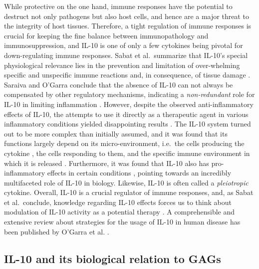 While protective on the one hand, immune responses have the potential to
destruct not only pathogens but also host cells, and hence are a major threat to
the integrity of host tissues. Therefore, a tight regulation of immune responses
is crucial for keeping the fine balance between immunopathology and
immunosuppression, and IL-10 is one of only a few cytokines being pivotal for
down-regulating immune responses. Sabat et al.\ summarize that IL-10's special
physiological relevance lies in the prevention and limitation of over-whelming
specific and unspecific immune reactions and, in consequence, of tissue damage
\cite{sabat_bio_il10_review_2010}. Saraiva and O'Garra conclude that the absence
of IL-10 can not always be compensated by other regulatory mechanisms,
indicating a \textit{non-redundant} role for IL-10 in limiting inflammation
\cite{saraiva_ogarra_2010}. However, despite the observed anti-inflammatory
effects of IL-10, the attempts to use it directly as a therapeutic agent in
various inflammatory conditions yielded disappointing results
\cite{il10_therapy_review_2003}. The IL-10 system turned out to be more complex
than initially assumed, and it was found that its functions largely depend on
its micro-environment, i.e.\ the cells producing the cytokine
\cite{roers_mueller_2008}, the cells responding to them, and the specific immune
environment in which it is released \cite{mosser_il10_newperspectives_2008}.
Furthermore, it was found that IL-10 also has pro-inflammatory effects in
certain conditions \cite{lauw_il10_proinflamm_2000}, pointing towards an
incredibly multifaceted role of IL-10 in biology. Likewise, IL-10 is often
called a \textit{pleiotropic} cytokine. Overall, IL-10 is a crucial regulator of
immune responses, and, as Sabat et al.\ conclude, knowledge regarding IL-10
effects forces us to think about modulation of IL-10 activity as a potential
therapy \cite{sabat_bio_il10_review_2010}. A comprehensible and extensive review
about strategies for the usage of IL-10 in human disease has been published
by O'Garra et al. \cite{il10_disease_strategies_ogarra_2008}.


\subsection{IL-10 and its biological relation to GAGs}

